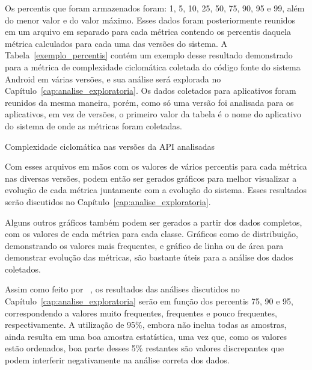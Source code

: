 Os percentis que foram armazenados foram: 1, 5, 10, 25, 50, 75, 90, 95 e 99, além do menor valor e do valor máximo. Esses dados foram posteriormente reunidos em um arquivo em separado para cada métrica contendo os percentis daquela métrica calculados para cada uma das versões do sistema. A Tabela~\ref{exemplo_percentis} contém um exemplo desse resultado demonstrado para a métrica de complexidade ciclomática coletada do código fonte do sistema Android em várias versões, e sua análise será explorada no Capítulo~\ref{cap:analise_exploratoria}. Os dados coletados para aplicativos foram reunidos da mesma maneira, porém, como só uma versão foi analisada para os aplicativos, em vez de versões, o primeiro valor da tabela é o nome do aplicativo do sistema de onde as métricas foram coletadas.

\begin{table}[!htb]
\centering
{}

\caption{Complexidade ciclomática nas versões da API analisadas}
\label{exemplo_percentis}
\end{table} 

Com esses arquivos em mãos com os valores de vários percentis para cada métrica nas diversas versões, podem então ser gerados gráficos para melhor visualizar a evolução de cada métrica juntamente com a evolução do sistema. Esses resultados serão discutidos no Capítulo~\ref{cap:analise_exploratoria}.

Alguns outros gráficos também podem ser gerados a partir dos dados completos, com os valores de cada métrica para cada classe. Gráficos como de distribuição, demonstrando os valores mais frequentes, e gráfico de linha ou de área para demonstrar evolução das métricas, são bastante úteis para a análise dos dados coletados. 

Assim como feito por ~, os resultados das análises discutidos no Capítulo~\ref{cap:analise_exploratoria} serão em função dos percentis 75, 90 e 95, correspondendo a valores muito frequentes, frequentes e pouco frequentes, respectivamente. A utilização de 95\%, embora não inclua todas as amostras, ainda resulta em uma boa amostra estatística, uma vez que, como os valores estão ordenados, boa parte desses 5\% restantes são valores discrepantes que podem interferir negativamente na análise correta dos dados.

